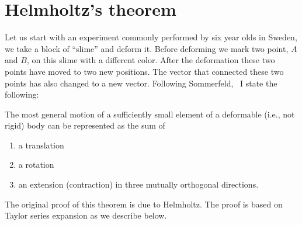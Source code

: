 \documentclass{tufte-book} %
\begin{document}
\section{Helmholtz's theorem}
\label{sec:helm}
Let us start with an experiment commonly performed by six year olds in
Sweden, we take a block of ``slime'' and deform it. Before deforming
we mark two point, $A$ and $B$,  on this slime with a different color. After the
deformation these two points have moved to two new positions. The
vector that connected these two points has also changed to a new
vector. Following Sommerfeld,~\cite{SomII06} I state the following: 
\marginnote{}
\begin{thm-non}
The most general motion of a sufficiently small element of a
deformable (i.e., not rigid) body can be represented as the sum of 
\begin{enumerate}
\item a translation
\item a rotation
\item an extension (contraction) in three mutually orthogonal
  directions. 
\end{enumerate}
\end{thm-non}
The original proof of this theorem is due to Helmholtz. 
The proof is based on Taylor series expansion as we describe below. 
\end{document}
